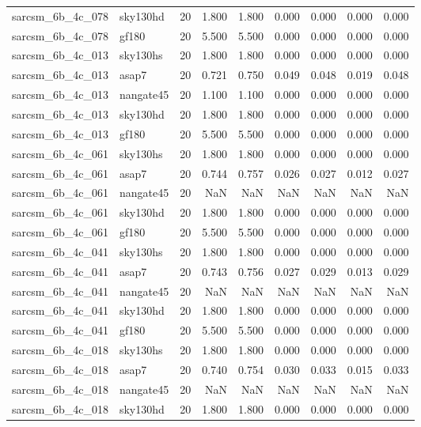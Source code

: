 \begin{tabular}{llrrrrrrr}
sarcsm\_6b\_4c\_078 & sky130hd & 20 & 1.800 & 1.800 & 0.000 & 0.000 & 0.000 & 0.000 \\
sarcsm\_6b\_4c\_078 & gf180 & 20 & 5.500 & 5.500 & 0.000 & 0.000 & 0.000 & 0.000 \\
sarcsm\_6b\_4c\_013 & sky130hs & 20 & 1.800 & 1.800 & 0.000 & 0.000 & 0.000 & 0.000 \\
sarcsm\_6b\_4c\_013 & asap7 & 20 & 0.721 & 0.750 & 0.049 & 0.048 & 0.019 & 0.048 \\
sarcsm\_6b\_4c\_013 & nangate45 & 20 & 1.100 & 1.100 & 0.000 & 0.000 & 0.000 & 0.000 \\
sarcsm\_6b\_4c\_013 & sky130hd & 20 & 1.800 & 1.800 & 0.000 & 0.000 & 0.000 & 0.000 \\
sarcsm\_6b\_4c\_013 & gf180 & 20 & 5.500 & 5.500 & 0.000 & 0.000 & 0.000 & 0.000 \\
sarcsm\_6b\_4c\_061 & sky130hs & 20 & 1.800 & 1.800 & 0.000 & 0.000 & 0.000 & 0.000 \\
sarcsm\_6b\_4c\_061 & asap7 & 20 & 0.744 & 0.757 & 0.026 & 0.027 & 0.012 & 0.027 \\
sarcsm\_6b\_4c\_061 & nangate45 & 20 & NaN & NaN & NaN & NaN & NaN & NaN \\
sarcsm\_6b\_4c\_061 & sky130hd & 20 & 1.800 & 1.800 & 0.000 & 0.000 & 0.000 & 0.000 \\
sarcsm\_6b\_4c\_061 & gf180 & 20 & 5.500 & 5.500 & 0.000 & 0.000 & 0.000 & 0.000 \\
sarcsm\_6b\_4c\_041 & sky130hs & 20 & 1.800 & 1.800 & 0.000 & 0.000 & 0.000 & 0.000 \\
sarcsm\_6b\_4c\_041 & asap7 & 20 & 0.743 & 0.756 & 0.027 & 0.029 & 0.013 & 0.029 \\
sarcsm\_6b\_4c\_041 & nangate45 & 20 & NaN & NaN & NaN & NaN & NaN & NaN \\
sarcsm\_6b\_4c\_041 & sky130hd & 20 & 1.800 & 1.800 & 0.000 & 0.000 & 0.000 & 0.000 \\
sarcsm\_6b\_4c\_041 & gf180 & 20 & 5.500 & 5.500 & 0.000 & 0.000 & 0.000 & 0.000 \\
sarcsm\_6b\_4c\_018 & sky130hs & 20 & 1.800 & 1.800 & 0.000 & 0.000 & 0.000 & 0.000 \\
sarcsm\_6b\_4c\_018 & asap7 & 20 & 0.740 & 0.754 & 0.030 & 0.033 & 0.015 & 0.033 \\
sarcsm\_6b\_4c\_018 & nangate45 & 20 & NaN & NaN & NaN & NaN & NaN & NaN \\
sarcsm\_6b\_4c\_018 & sky130hd & 20 & 1.800 & 1.800 & 0.000 & 0.000 & 0.000 & 0.000 \\

\end{tabular}
